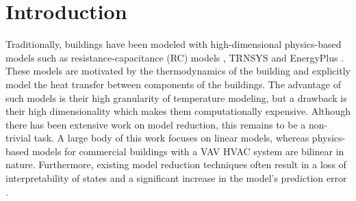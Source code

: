 
\section{Introduction}
\label{sec:Introduction}
%
%

Traditionally, buildings have been modeled with high-dimensional physics-based models such as resistance-capacitance (RC) models \cite{Maasoumy:2014ab, Sun, David, Hao_multizone}, TRNSYS \cite{Duffy:2009aa} and EnergyPlus \cite{Zhao2013EP}. These models are motivated by the thermodynamics of the building and explicitly model the heat transfer between components of the buildings. The advantage of such models is their high granularity of temperature modeling, but a drawback is their high dimensionality which makes them computationally expensive. 
Although there has been extensive work on model reduction, this remains to be a non-trivial task. A large body of this work focuses on linear models, whereas physics-based models for commercial buildings with a VAV HVAC system are bilinear in nature. Furthermore, existing model reduction techniques often result in a loss of interpretability of states \cite{Dobbs:2012aa} and a significant increase in the model's prediction error \cite{Goyal:2012modelreduction}. 

